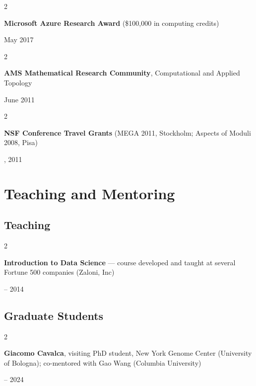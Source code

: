 \documentclass[10pt, letterpaper]{article}
\newenvironment{twocolentry}[2][]{
    \onecolentry
    \def\secondColumn{#2}
    \setcolumnwidth{\fill, 4.5 cm}
    \begin{paracol}{2}
}{
    \switchcolumn \raggedleft \secondColumn
    \end{paracol}
    \endonecolentry
} %
\begin{document}
    \vspace{0.20 cm}

    \begin{twocolentry}{
        May 2017
    }
        \textbf{Microsoft Azure Research Award} (\$100,000 in computing credits)
    \end{twocolentry}

    \vspace{0.20 cm}

    \begin{twocolentry}{
        June 2011
    }
        \textbf{AMS Mathematical Research Community}, Computational and Applied Topology
    \end{twocolentry}

    \vspace{0.20 cm}

    \begin{twocolentry}{
        2008, 2011
    }
        \textbf{NSF Conference Travel Grants} (MEGA 2011, Stockholm; Aspects of Moduli 2008, Pisa)
    \end{twocolentry}



\section{Teaching and Mentoring}

\subsection{Teaching}

    \begin{twocolentry}{
        2013 – 2014
    }
        \textbf{Introduction to Data Science} --- course developed and taught at several Fortune 500 companies (Zaloni, Inc)
    \end{twocolentry}

    \vspace{0.20 cm}

\subsection{Graduate Students}

    \begin{twocolentry}{
        2023 – 2024
    }
        \textbf{Giacomo Cavalca}, visiting PhD student, New York Genome Center (University of Bologna); co-mentored with Gao Wang (Columbia University)
    \end{twocolentry}
\end{document}
